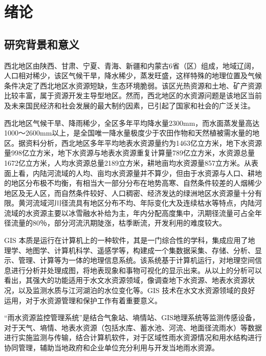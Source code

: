 
\chapter{绪论}

\section{研究背景和意义}

西北地区由陕西、甘肃、宁夏、青海、新疆和内蒙古6省（区）组成，地域辽阔，人口相对稀少，该区气候干旱，降水稀少，蒸发旺盛，这样特殊的地理位置及气候条件决定了西北地区水资源短缺，生态环境脆弱。该区光热资源和土地、矿产资源比较丰富，属于资源开发主导型地区。然而，西北地区的水资源问题是该地区当前及未来国民经济和社会发展的最大制约因素，已引起了国家和社会的广泛关注\cite{黄智煌邬娜-2}。

西北地区气候干旱、降雨稀少，全区多年平均降水量2300mm，而水面蒸发量高达1000～2600mm以上，是全国唯一降水量极度少于农田作物和天然植被需水量的地区。据资料分析，西北地区多年平均地表水资源量约为1463亿立方米，地下水资源量998亿立方米，地下水资源与地表水资源重复计算量789亿立方米，水资源总量1672亿立方米，人均水资源总量2189立方米，耕地亩均水资源量857立方米。从表面上看，内陆河流域的人均、亩均水资源量并不算少，但由于水资源与人口、耕地的地区分布极不均衡，有相当大一部分分布在地势高寒、自然条件较差的人烟稀少地区及无人区，而自然条件较好、人口稠密、经济发达的绿洲地区水资源量十分有限。黄河流域河川径流具有地区分布不均、年际变化大及连续枯水等特点，内陆河流域的水资源主要以冰雪融水补给为主，年内分配高度集中，汛期径流量可占全年径流量的80％，部分河流汛期陡涨，枯季断流，开发利用的难度较大。\cite{仇巍巍陈从喜-1}


GIS 本质是运行在计算机上的一种软件，其是一门综合性的学科，集成应用了地理学、地图学、计算机科学、遥感学等，构建成一个集数据采集、存储、分析、显示、管理、计算等为一体的地理信息系统。该系统基于计算机运行，对地理空间信息进行分析并处理成图，将地表现象和事物可视化的显示出来。从以上的分析可以看出，其强大的功能适用于水文水资源领域，像调查地下水资源、地表水资源状况，以及监测水质与江河湖泊的水位变化等。GIS 技术在水文水资源领域的良好运用，对于水资源管理和保护工作有着重要意义。\cite{张国治韩景琦-3}

“雨水资源监控管理系统”是结合气象站、墒情站、GIS地理系统等监测传感设备，对于天气、墒情、地表水资源（包括水库、蓄水池、河流、地面径流雨水）等数据进行实施监测与传输，结合计算机软件，对于区域性雨水资源情况和用水结构进行协同管理，辅助当地政府和企业单位充分利用与开发当地雨水资源。\cite{郭明华-4}

